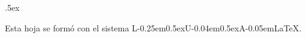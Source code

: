 \documentclass[12pt,letterpaper]{article}
\newcommand{\fej}{\relax\hfill\ifmmode{\lower.5ex\hbox{{\textcolor{blue}{\LARGE\smiley al 15pt}}}}\else\lower.5ex\hbox{{\textcolor{blue}{\LARGE \smiley}}}}  %
\newcommand{\LuaLaTeX}{L\kern-0.25em\raise0.5ex\hbox{\tiny U}\kern-0.04em\raise0.5ex\hbox{\tiny A}\kern-0.05em\LaTeX}
\begin{document}
\fej






\smallskip






\vfill 



\begin{center}
	{\footnotesize\color{olive} Esta hoja se formó con el sistema \LuaLaTeX.}
\end{center}
\end{document}
